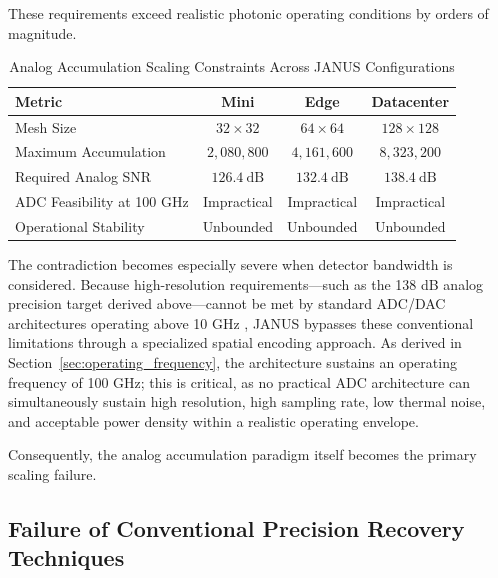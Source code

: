 \documentclass[journal]{IEEEtran}
\begin{document}
These requirements exceed realistic photonic operating conditions by orders of magnitude.

\begin{table}[htbp]
\centering
\caption{
Analog Accumulation Scaling Constraints Across JANUS Configurations
}
\label{tab:analog_constraints}
\begin{tabular}{lccc}
\toprule
\textbf{Metric} & \textbf{Mini} & \textbf{Edge} & \textbf{Datacenter} \\
\midrule

Mesh Size & $32 \times 32$ & $64 \times 64$ & $128 \times 128$ \\

Maximum Accumulation & $2{,}080{,}800$ & $4{,}161{,}600$ & $8{,}323{,}200$ \\

Required Analog SNR & $126.4~\mathrm{dB}$ & $132.4~\mathrm{dB}$ & $138.4~\mathrm{dB}$ \\

ADC Feasibility at 100 GHz  & Impractical & Impractical & Impractical \\

Operational Stability & Unbounded & Unbounded & Unbounded \\

\bottomrule
\end{tabular}
\end{table}

The contradiction becomes especially severe when detector bandwidth is considered. Because high-resolution requirements---such as the 138 dB analog precision target derived above---cannot be met by standard ADC/DAC architectures operating above 10 GHz , JANUS bypasses these conventional limitations through a specialized spatial encoding approach. As derived in Section~\ref{sec:operating_frequency}, the architecture sustains an operating frequency of 100 GHz; this is critical, as no practical ADC architecture can simultaneously sustain high resolution, high sampling rate, low thermal noise, and acceptable power density within a realistic operating envelope.

Consequently, the analog accumulation paradigm itself becomes the primary scaling failure.

\subsection{\textbf{Failure of Conventional Precision Recovery Techniques}}
\end{document}
